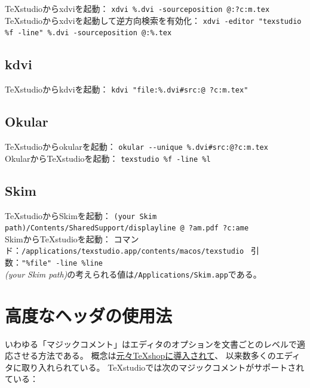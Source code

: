 TeXstudioからxdviを起動：
 \texttt{xdvi \%.dvi -sourceposition @:?c:m.tex}\\

TeXstudioからxdviを起動して逆方向検索を有効化：
 \texttt{xdvi -editor "texstudio \%f -line" \%.dvi -sourceposition @:\%.tex}

\subsection{kdvi}

TeXstudioからkdviを起動：
 \texttt{kdvi "file:\%.dvi\#src:@ ?c:m.tex"}

\subsection{Okular}

TeXstudioからokularを起動：
 \verb+okular --unique %.dvi#src:@?c:m.tex+\\

OkularからTeXstudioを起動： \verb+texstudio %f -line %l+

\subsection{Skim}

TeXstudioからSkimを起動：
 \texttt{(your Skim path)/Contents/SharedSupport/displayline @ ?am.pdf ?c:ame}\\

SkimからTeXstudioを起動：
コマンド：\verb+/applications/texstudio.app/contents/macos/texstudio+
\ 引数：\verb+"%file" -line %line+\\

\emph{(your Skim path)}の考えられる値は\verb+/Applications/Skim.app+である。

\section{高度なヘッダの使用法}\label{sec:magiccomment}


いわゆる「マジックコメント」はエディタのオプションを文書ごとのレベルで適応させる方法である。
概念は\href{http://www.texdev.net/2011/03/24/texworks-magic-comments/}{元々TeXshopに導入されて}、
以来数多くのエディタに取り入れられている。
TeXstudioでは次のマジックコメントがサポートされている：

